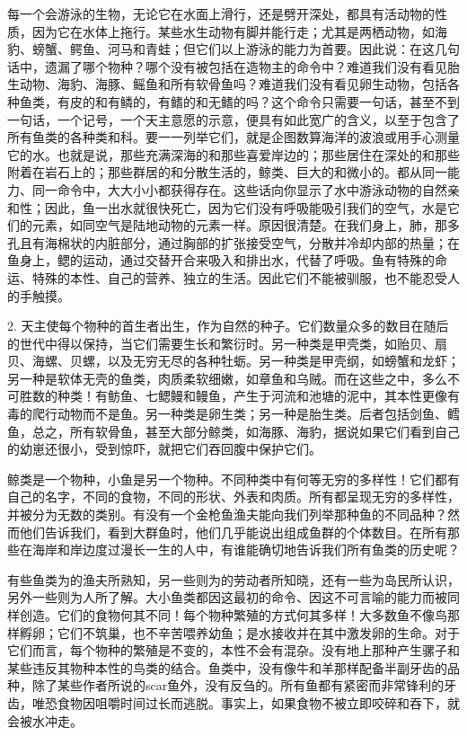 每一个会游泳的生物，无论它在水面上滑行，还是劈开深处，都具有活动物的性质，因为它在水体上拖行。某些水生动物有脚并能行走；尤其是两栖动物，如海豹、螃蟹、鳄鱼、河马和青蛙；但它们以上游泳的能力为首要。因此说：在这几句话中，遗漏了哪个物种？哪个没有被包括在造物主的命令中？难道我们没有看见胎生动物、海豹、海豚、鳐鱼和所有软骨鱼吗？难道我们没有看见卵生动物，包括各种鱼类，有皮的和有鳞的，有鳍的和无鳍的吗？这个命令只需要一句话，甚至不到一句话，一个记号，一个天主意愿的示意，便具有如此宽广的含义，以至于包含了所有鱼类的各种类和科。要一一列举它们，就是企图数算海洋的波浪或用手心测量它的水。也就是说，那些充满深海的和那些喜爱岸边的；那些居住在深处的和那些附着在岩石上的；那些群居的和分散生活的，鲸类、巨大的和微小的。都从同一能力、同一命令中，大大小小都获得存在。这些话向你显示了水中游泳动物的自然亲和性；因此，鱼一出水就很快死亡，因为它们没有呼吸能吸引我们的空气，水是它们的元素，如同空气是陆地动物的元素一样。原因很清楚。在我们身上，肺，那多孔且有海棉状的内脏部分，通过胸部的扩张接受空气，分散并冷却内部的热量；在鱼身上，鳃的运动，通过交替开合来吸入和排出水，代替了呼吸。鱼有特殊的命运、特殊的本性、自己的营养、独立的生活。因此它们不能被驯服，也不能忍受人的手触摸。\par

2.  天主使每个物种的首生者出生，作为自然的种子。它们数量众多的数目在随后的世代中得以保持，当它们需要生长和繁衍时。另一种类是甲壳类，如贻贝、扇贝、海螺、贝螺，以及无穷无尽的各种牡蛎。另一种类是甲壳纲，如螃蟹和龙虾；另一种是软体无壳的鱼类，肉质柔软细嫩，如章鱼和乌贼。而在这些之中，多么不可胜数的种类！有鲂鱼、七鳃鳗和鳗鱼，产生于河流和池塘的泥中，其本性更像有毒的爬行动物而不是鱼。另一种类是卵生类；另一种是胎生类。后者包括剑鱼、鳕鱼，总之，所有软骨鱼，甚至大部分鲸类，如海豚、海豹，据说如果它们看到自己的幼崽还很小，受到惊吓，就把它们吞回腹中保护它们。\par

 鲸类是一个物种，小鱼是另一个物种。不同种类中有何等无穷的多样性！它们都有自己的名字，不同的食物，不同的形状、外表和肉质。所有都呈现无穷的多样性，并被分为无数的类别。有没有一个金枪鱼渔夫能向我们列举那种鱼的不同品种？然而他们告诉我们，看到大群鱼时，他们几乎能说出组成鱼群的个体数目。在所有那些在海岸和岸边度过漫长一生的人中，有谁能确切地告诉我们所有鱼类的历史呢？\par

有些鱼类为的渔夫所熟知，另一些则为的劳动者所知晓，还有一些为岛民所认识，另外一些则为人所了解。大小鱼类都因这最初的命令、因这不可言喻的能力而被同样创造。它们的食物何其不同！每个物种繁殖的方式何其多样！大多数鱼不像鸟那样孵卵；它们不筑巢，也不辛苦喂养幼鱼；是水接收并在其中激发卵的生命。对于它们而言，每个物种的繁殖是不变的，本性不会有混杂。没有地上那种产生骡子和某些违反其物种本性的鸟类的结合。鱼类中，没有像牛和羊那样配备半副牙齿的品种，除了某些作者所说的scar鱼外，没有反刍的。所有鱼都有紧密而非常锋利的牙齿，唯恐食物因咀嚼时间过长而逃脱。事实上，如果食物不被立即咬碎和吞下，就会被水冲走。\par

